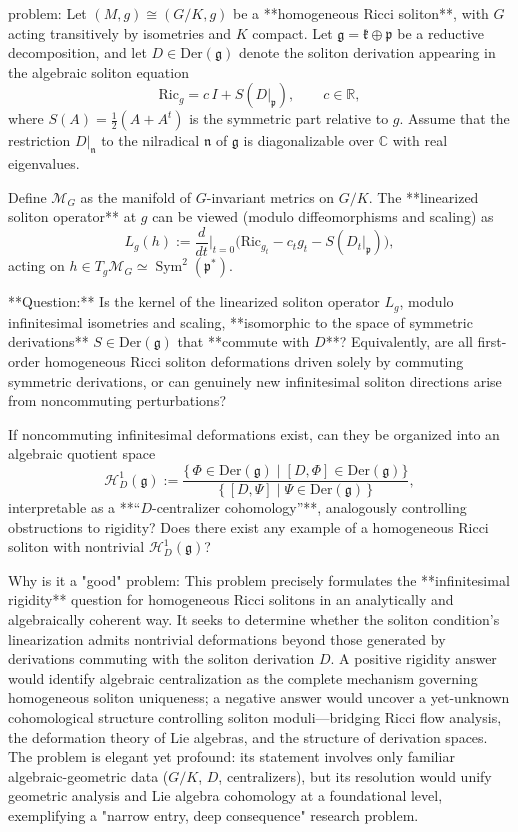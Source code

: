 problem:  
Let \( (M,g) \cong (G/K,g) \) be a **homogeneous Ricci soliton**, with \( G \) acting transitively by isometries and \( K \) compact.  
Let \( \mathfrak g = \mathfrak k \oplus \mathfrak p \) be a reductive decomposition, and let \( D\in \mathrm{Der}(\mathfrak g) \) denote the soliton derivation appearing in the algebraic soliton equation  
\[
\mathrm{Ric}_g = c\, I + S(D|_{\mathfrak p}), \qquad c \in \mathbb{R},
\]
where \( S(A)=\tfrac12(A+A^t) \) is the symmetric part relative to \(g\).  
Assume that the restriction \( D|_{\mathfrak n} \) to the nilradical \( \mathfrak n \) of \( \mathfrak g \) is diagonalizable over \( \mathbb C \) with real eigenvalues.

Define \( \mathcal{M}_G \) as the manifold of \( G \)-invariant metrics on \( G/K \).  
The **linearized soliton operator** at \(g\) can be viewed (modulo diffeomorphisms and scaling) as
\[
L_g(h) := \frac{d}{dt}\Big|_{t=0} \big(\mathrm{Ric}_{g_t} - c_t g_t - S(D_{t}|_{\mathfrak p})\big),
\]
acting on \( h \in T_g \mathcal{M}_G \simeq  \operatorname{Sym}^2(\mathfrak p^*) \).

**Question:**  
Is the kernel of the linearized soliton operator \(L_g\), modulo infinitesimal isometries and scaling, **isomorphic to the space of symmetric derivations** \( S \in \mathrm{Der}(\mathfrak g) \) that **commute with \(D\)**?  
Equivalently, are all first-order homogeneous Ricci soliton deformations driven solely by commuting symmetric derivations, or can genuinely new infinitesimal soliton directions arise from noncommuting perturbations?

If noncommuting infinitesimal deformations exist, can they be organized into an algebraic quotient space
\[
\mathcal{H}^1_D(\mathfrak g)
:= 
\frac{\{\,\Phi \in \mathrm{Der}(\mathfrak g) \mid [D,\Phi] \in \mathrm{Der}(\mathfrak g)\}}
{\{\, [D,\Psi] \mid \Psi \in \mathrm{Der}(\mathfrak g) \,\}},
\]
interpretable as a **“\(D\)-centralizer cohomology”**, analogously controlling obstructions to rigidity?  
Does there exist any example of a homogeneous Ricci soliton with nontrivial \(\mathcal{H}^1_D(\mathfrak g)\)?

Why is it a "good" problem:  
This problem precisely formulates the **infinitesimal rigidity** question for homogeneous Ricci solitons in an analytically and algebraically coherent way. It seeks to determine whether the soliton condition’s linearization admits nontrivial deformations beyond those generated by derivations commuting with the soliton derivation \(D\). A positive rigidity answer would identify algebraic centralization as the complete mechanism governing homogeneous soliton uniqueness; a negative answer would uncover a yet-unknown cohomological structure controlling soliton moduli—bridging Ricci flow analysis, the deformation theory of Lie algebras, and the structure of derivation spaces.  
The problem is elegant yet profound: its statement involves only familiar algebraic-geometric data (\(G/K\), \(D\), centralizers), but its resolution would unify geometric analysis and Lie algebra cohomology at a foundational level, exemplifying a "narrow entry, deep consequence" research problem.
